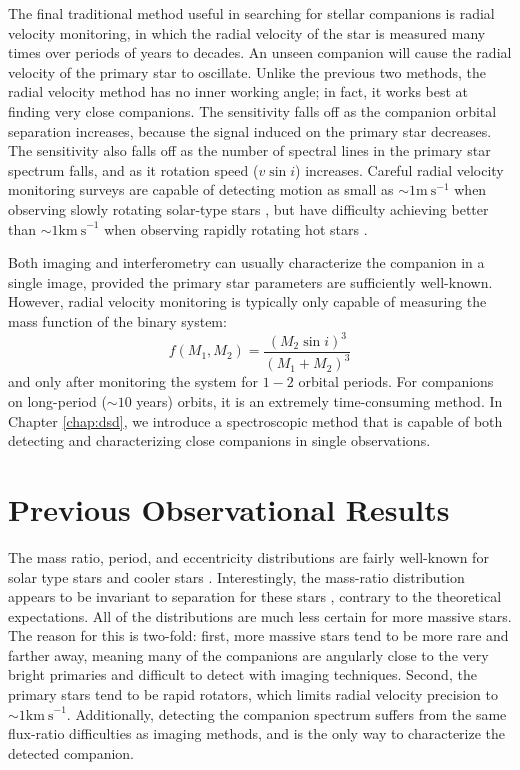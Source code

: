 \documentclass{utthesis}
\begin{document}
The final traditional method useful in searching for stellar companions is radial velocity monitoring, in which the radial velocity of the star is measured many times over periods of years to decades. An unseen companion will cause the radial velocity of the primary star to oscillate. Unlike the previous two methods, the radial velocity method has no inner working angle; in fact, it works best at finding very close companions. The sensitivity falls off as the companion orbital separation increases, because the signal induced on the primary star decreases. The sensitivity also falls off as the number of spectral lines in the primary star spectrum falls, and as it rotation speed ($v\sin{i}$) increases. Careful radial velocity monitoring surveys are capable of detecting motion as small as $\sim 1 \mathrm{m\ s}^{-1}$ when observing slowly rotating solar-type stars \citep[e.g.][]{Wittenmyer2006, Fischer2009, Pepe2011}, but have difficulty achieving better than $\sim 1 \mathrm{km\ s}^{-1}$ when observing rapidly rotating hot stars \citep{Becker2015}.

Both imaging and interferometry can usually characterize the companion in a single image, provided the primary star parameters are sufficiently well-known. However, radial velocity monitoring is typically only capable of measuring the mass function of the binary system:
\begin{equation}
 f(M_1, M_2) = \frac{(M_2\sin{i})^3}{(M_1+M_2)^3}
 \end{equation}
 and only after monitoring the system for $1-2$ orbital periods. For companions on long-period ($\sim 10$ years) orbits, it is an extremely time-consuming method. In Chapter \ref{chap:dsd}, we introduce a spectroscopic method that is capable of both detecting and characterizing close companions in single observations.


\section{Previous Observational Results}

The mass ratio, period, and eccentricity distributions are fairly well-known for solar type stars \citep{Duquennoy1991, Raghavan2010} and cooler stars \citep{Fischer1992, Delfosse2004}. Interestingly, the mass-ratio distribution appears to be invariant to separation for these stars \citep{Meyer2013}, contrary to the theoretical expectations. All of the distributions are much less certain for more massive stars. The reason for this is two-fold: first, more massive stars tend to be more rare and farther away, meaning many of the companions are angularly close to the very bright primaries and difficult to detect with imaging techniques. Second, the primary stars tend to be rapid rotators, which limits radial velocity precision to $\sim 1 \mathrm{km\ s}^{-1}$. Additionally, detecting the companion spectrum suffers from the same flux-ratio difficulties as imaging methods, and is the only way to characterize the detected companion.
\end{document}
